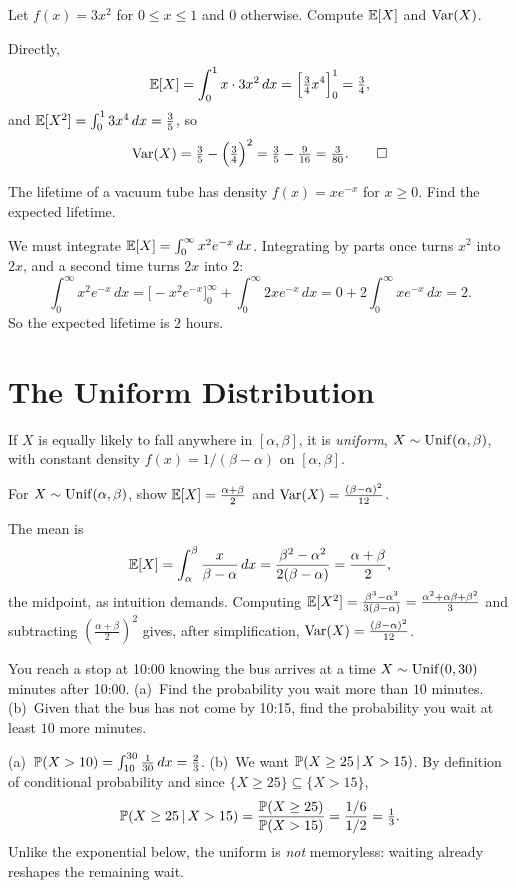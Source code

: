 \begin{example}
Let $f(x)=3x^2$ for $0\le x\le 1$ and $0$ otherwise. Compute $\mathbb{E}[X]$ and
$\mathrm{Var}(X)$.

\solution Directly,
\[
  \mathbb{E}[X]=\int_0^1 x\cdot 3x^2\,dx=\Bigl[\tfrac34 x^4\Bigr]_0^1=\tfrac34,
\]
and $\mathbb{E}[X^2]=\int_0^1 3x^4\,dx=\tfrac35$, so
\[
  \mathrm{Var}(X)=\tfrac35-\Bigl(\tfrac34\Bigr)^2=\tfrac35-\tfrac{9}{16}=\tfrac{3}{80}. \qedhere
\]
\end{example}

\begin{example}
The lifetime of a vacuum tube has density $f(x)=xe^{-x}$ for $x\ge 0$. Find the
expected lifetime.

\solution We must integrate $\mathbb{E}[X]=\int_0^\infty x^2 e^{-x}\,dx$. Integrating by
parts once turns $x^2$ into $2x$, and a second time turns $2x$ into $2$:
\[
  \int_0^\infty x^2 e^{-x}\,dx
   = \bigl[-x^2 e^{-x}\bigr]_0^\infty + \int_0^\infty 2x e^{-x}\,dx
   = 0 + 2\int_0^\infty x e^{-x}\,dx = 2.
\]
So the expected lifetime is $2$ hours.
\end{example}

\section{The Uniform Distribution}

If $X$ is equally likely to fall anywhere in $[\alpha,\beta]$, it is
\emph{uniform}, $X\sim\mathrm{Unif}(\alpha,\beta)$, with constant density
$f(x)=1/(\beta-\alpha)$ on $[\alpha,\beta]$.

\begin{example}
For $X\sim\mathrm{Unif}(\alpha,\beta)$, show $\mathbb{E}[X]=\tfrac{\alpha+\beta}{2}$ and
$\mathrm{Var}(X)=\tfrac{(\beta-\alpha)^2}{12}$.

\solution The mean is
\[
  \mathbb{E}[X]=\int_\alpha^\beta \frac{x}{\beta-\alpha}\,dx
   =\frac{\beta^2-\alpha^2}{2(\beta-\alpha)}=\frac{\alpha+\beta}{2},
\]
the midpoint, as intuition demands. Computing $\mathbb{E}[X^2]=\frac{\beta^3-\alpha^3}{3(\beta-\alpha)}=\frac{\alpha^2+\alpha\beta+\beta^2}{3}$ and subtracting $(\tfrac{\alpha+\beta}{2})^2$ gives, after simplification, $\mathrm{Var}(X)=\frac{(\beta-\alpha)^2}{12}$.
\end{example}

\begin{example}
You reach a stop at 10:00 knowing the bus arrives at a time
$X\sim\mathrm{Unif}(0,30)$ minutes after 10:00. (a)~Find the probability you wait more
than $10$ minutes. (b)~Given that the bus has not come by 10:15, find the
probability you wait at least $10$ more minutes.

\solution (a)~$\mathbb{P}(X>10)=\int_{10}^{30}\tfrac1{30}\,dx=\tfrac23$. (b)~We want
$\mathbb{P}(X\ge 25\,|\, X>15)$. By definition of conditional probability and since
$\{X\ge 25\}\subseteq\{X>15\}$,
\[
  \mathbb{P}(X\ge 25\,|\, X>15)=\frac{\mathbb{P}(X\ge 25)}{\mathbb{P}(X>15)}
   =\frac{1/6}{1/2}=\tfrac13.
\]
Unlike the exponential below, the uniform is \emph{not} memoryless: waiting
already reshapes the remaining wait.
\end{example}

